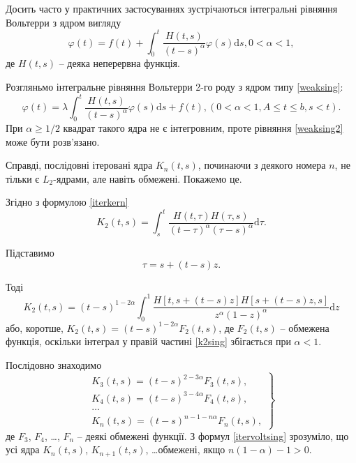\documentclass[14pt,twoside]{extreport}
\theoremstyle{mystyle}
\numberwithin{equation}{chapter}
\begin{document}
Досить часто у практичних застосуваннях зустрічаються інтегральні рівняння Вольтерри з ядром вигляду
\begin{equation}\label{weaksing}
	\varphi(t)=f(t)+\displaystyle \int_{0}^{t}\frac{H(t, s)}{(t-s)^{\alpha}}\varphi(s)\mathrm{d}s, 0<\alpha<1,
\end{equation}
де $H(t, s)$ -- деяка неперервна функція.

Розгляньмо інтегральне рівняння Вольтерри 2-го роду з ядром типу \eqref{weaksing}:
\begin{equation}\label{weaksing2}
	\varphi(t)=\displaystyle \lambda\int_{0}^{t}\frac{H(t, s)}{(t-s)^{\alpha}}\varphi(s)\mathrm{d}s + f(t), (0<\alpha<1, A\leqslant t \leqslant b, s<t).
\end{equation}
При $\alpha \geqslant 1/2$ квадрат такого ядра не є інтегровним, проте рівняння \eqref{weaksing2} може бути розв'язано.

Справді, послідовні ітеровані ядра $K_n(t, s)$, починаючи з деякого номера $n$, не тільки є $L_2$-ядрами, але навіть обмежені. Покажемо це.

Згідно з формулою \eqref{iterkern}
\[
 K_2(t, s) = \int_{s}^{t} \frac{H(t, \tau)H(\tau, s)}{(t - \tau)^\alpha(\tau - s)^\alpha}\mathrm{d}\tau.
\]

Підставимо
\[
 \tau = s + (t - s)z.
\]

Тоді
\begin{equation}\label{k2sing}
 K_2(t, s) = (t-s)^{1-2\alpha} \int_0^1 \dfrac{H[t, s + (t-s)z] H[s + (t-s)z, s]}{z^\alpha (1-z)^\alpha} \mathrm{d}z
\end{equation}
або, коротше, $K_2(t, s) = (t - s)^{1-2\alpha}F_2(t, s)$, де $F_2(t, s)$ -- обмежена функція, оскільки інтеграл у правій частині \eqref{k2sing} збігається при $\alpha < 1$.

Послідовно знаходимо
\begin{equation}\label{itervoltsing}
\left.
 \begin{array}{l}
 K_3(t, s) = (t-s)^{2-3\alpha} F_3(t, s),\\
 K_4(t, s) = (t-s)^{3-4\alpha} F_4(t, s),\\
 \ldots\\
 K_n(t, s) = (t-s)^{n-1-n\alpha} F_n(t, s),
 \end{array}
\right\}
\end{equation}
де $F_3$, $F_4$, \ldots, $F_n$ -- деякі обмежені функції. З формул \eqref{itervoltsing} зрозуміло, що усі ядра $K_n(t, s)$, $K_{n+1}(t, s)$, \ldots обмежені, якщо $n(1-\alpha) -1 >0$.
\end{document}
